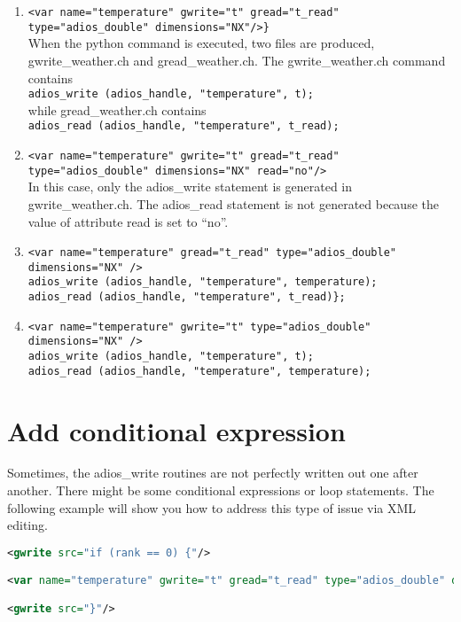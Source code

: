 \begin{enumerate}
\item \verb+<var name="temperature" gwrite="t" gread="t_read" type="adios_double" dimensions="NX"/>}+
\\
When the python command is executed, two files are produced, gwrite\_weather.ch 
and gread\_weather.ch. The gwrite\_weather.ch command contains 
\\
\verb+adios_write (adios_handle, "temperature", t);+
\\
while gread\_weather.ch contains
\\
\verb+adios_read (adios_handle, "temperature", t_read);+

\item \verb+<var name="temperature" gwrite="t" gread="t_read" type="adios_double" dimensions="NX" read="no"/>+
\\
In this case, only the adios\_write statement is generated in gwrite\_weather.ch. 
The adios\_read statement is not generated because the value of attribute read 
is set to ``no''. 

\item \verb+<var name="temperature" gread="t_read" type="adios_double" dimensions="NX" />+
\\
\verb+adios_write (adios_handle, "temperature", temperature);+
\\
\verb+adios_read (adios_handle, "temperature", t_read)};+

\item \verb+<var name="temperature" gwrite="t" type="adios_double" dimensions="NX" />+
\\
\verb+adios_write (adios_handle, "temperature", t);+
\\
\verb+adios_read (adios_handle, "temperature", temperature);+

\end{enumerate}



\section{Add conditional expression}

Sometimes, the adios\_write routines are not perfectly written out one after another. 
There might be some conditional expressions or loop statements. The following example 
will show you how to address this type of issue via XML editing.

\begin{lstlisting}[language=XML]
<gwrite src="if (rank == 0) {"/>

<var name="temperature" gwrite="t" gread="t_read" type="adios_double" dimensions="NX" read="no"/>

<gwrite src="}"/>
\end{lstlisting}

